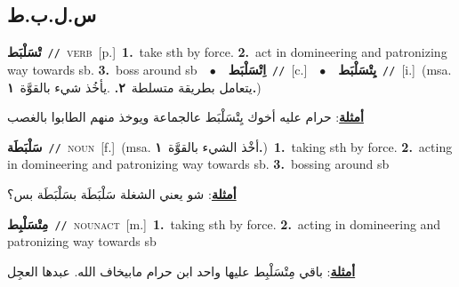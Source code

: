 \documentclass[10pt,a4paper,twoside]{article} %
\begin{document}
\begin{multicols}{2}
\vspace{-3mm}
\subsection*{\color{blue}\foreignlanguage{arabic}{س.ل.ب.ط}\color{blue}{}} 

{\setlength\topsep{0pt}\textbf{\foreignlanguage{arabic}{تْسَلْبَط}}\ {\color{gray}\texttt{//}\color{black}}\ \textsc{verb}\ [p.]\ \textbf{1.}~take sth by force.  \textbf{2.}~act in domineering and patronizing way towards sb.  \textbf{3.}~boss around sb\ \ $\bullet$\ \ \setlength\topsep{0pt}\textbf{\foreignlanguage{arabic}{اِتْسَلْبَط}}\ {\color{gray}\texttt{//}\color{black}}\ [c.]\ \ $\bullet$\ \ \setlength\topsep{0pt}\textbf{\foreignlanguage{arabic}{يِتْسَلْبَط}}\ {\color{gray}\texttt{//}\color{black}}\ [i.]\ \color{gray}(msa. \foreignlanguage{arabic}{يتعامل بطريقة متسلطة}~\foreignlanguage{arabic}{\textbf{٢.}}  .\foreignlanguage{arabic}{يأخُذ شيء بالقوَّة}~\foreignlanguage{arabic}{\textbf{١.}})\color{black}\  \begin{flushright}\color{gray}\foreignlanguage{arabic}{\textbf{\underline{\foreignlanguage{arabic}{أمثلة}}}: حرام عليه أخوك يِتْسَلْبَط عالجماعة ويوخذ منهم الطابوا بالغصب}\end{flushright}\color{black}} \vspace{2mm}

{\setlength\topsep{0pt}\textbf{\foreignlanguage{arabic}{سَلْبَطَة}}\ {\color{gray}\texttt{//}\color{black}}\ \textsc{noun}\ [f.]\ \color{gray}(msa. \foreignlanguage{arabic}{أخْذ الشيء بالقوَّة}~\foreignlanguage{arabic}{\textbf{١.}})\color{black}\ \textbf{1.}~taking sth by force.  \textbf{2.}~acting in domineering and patronizing way towards sb.  \textbf{3.}~bossing around sb\  \begin{flushright}\color{gray}\foreignlanguage{arabic}{\textbf{\underline{\foreignlanguage{arabic}{أمثلة}}}: شو يعني الشغلة سَلْبَطَة بسَلْبَطَة بس؟}\end{flushright}\color{black}} \vspace{2mm}

{\setlength\topsep{0pt}\textbf{\foreignlanguage{arabic}{مِتْسَلْبِط}}\ {\color{gray}\texttt{//}\color{black}}\ \textsc{noun\textunderscore act}\ [m.]\ \textbf{1.}~taking sth by force.  \textbf{2.}~acting in domineering and patronizing way towards sb\  \begin{flushright}\color{gray}\foreignlanguage{arabic}{\textbf{\underline{\foreignlanguage{arabic}{أمثلة}}}: باقي مِتْسَلْبِط عليها واحد ابن حرام مابيخاف الله. عبدها العجِل}\end{flushright}\color{black}} \vspace{2mm}


\end{multicols}
\end{document}

